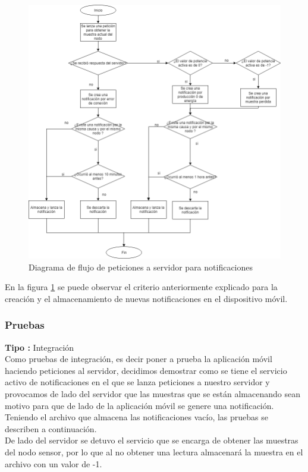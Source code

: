 \begin{figure}[H]
	\centering
	\includegraphics[scale=.65]{Capitulo5/images/df_notificacionServidor.png}
	\caption{Diagrama de flujo de peticiones a servidor para notificaciones}	
	\label{fig:Diagrama de flujo de peticiones a servidor para notificaciones}
\end{figure} 

En la figura \ref{fig:Diagrama de flujo de peticiones a servidor para notificaciones} se puede observar el criterio anteriormente explicado para la creación y el almacenamiento de nuevas notificaciones en el dispositivo móvil.

\subsubsection{Pruebas}
\textbf{Tipo :} Integración \\ \newline
Como pruebas de integración, es decir poner a prueba la aplicación móvil haciendo peticiones al servidor, decidimos demostrar como se tiene el servicio activo de notificaciones en el que se lanza peticiones a nuestro servidor y provocamos de lado del servidor que las muestras que se están almacenando sean motivo para que de lado de la aplicación móvil se genere una notificación.
\\ \newline
Teniendo el archivo que almacena las notificaciones vacío, las pruebas se describen a continuación.
\\ \newline
De lado del servidor se detuvo el servicio que se encarga de obtener las muestras del nodo sensor, por lo que al no obtener una lectura almacenará la muestra en el archivo con un valor de -1.

